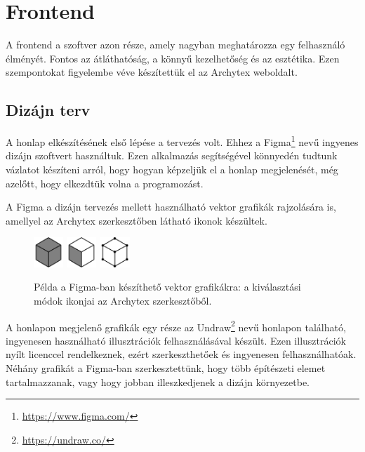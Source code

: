 \section{Frontend}

A frontend a szoftver azon része, amely nagyban meghatározza egy felhasználó élményét. Fontos az átláthatóság, a könnyű kezelhetőség és az esztétika. Ezen szempontokat figyelembe véve készítettük el az Archytex weboldalt.

\subsection{Dizájn terv}
A honlap elkészítésének első lépése a tervezés volt. Ehhez a Figma\footnote{\url{https://www.figma.com/}} nevű ingyenes dizájn szoftvert használtuk. Ezen alkalmazás segítségével könnyedén tudtunk vázlatot készíteni arról, hogy hogyan képzeljük el a honlap megjelenését, még azelőtt, hogy elkezdtük volna a programozást.

A Figma a dizájn tervezés mellett használható vektor grafikák rajzolására is, amellyel az Archytex szerkesztőben látható ikonok készültek.

\begin{figure}[H]
  \centering
  \includegraphics[width=0.1\textwidth]{parts/developer-documentation/frontend/images/meshSelectMode.png}
  \includegraphics[width=0.1\textwidth]{parts/developer-documentation/frontend/images/faceSelectMode.png}
  \includegraphics[width=0.1\textwidth]{parts/developer-documentation/frontend/images/vertexSelectMode.png}
  \caption{Példa a Figma-ban készíthető vektor grafikákra: a kiválasztási módok ikonjai az Archytex szerkesztőből.}
\end{figure}

A honlapon megjelenő grafikák egy része az Undraw\footnote{\url{https://undraw.co/}} nevű honlapon található, ingyenesen használható illusztrációk felhasználásával készült. Ezen illusztrációk nyílt licenccel rendelkeznek, ezért szerkeszthetőek és ingyenesen felhasználhatóak. Néhány grafikát a Figma-ban szerkesztettünk, hogy több építészeti elemet tartalmazzanak, vagy hogy jobban illeszkedjenek a dizájn környezetbe.

